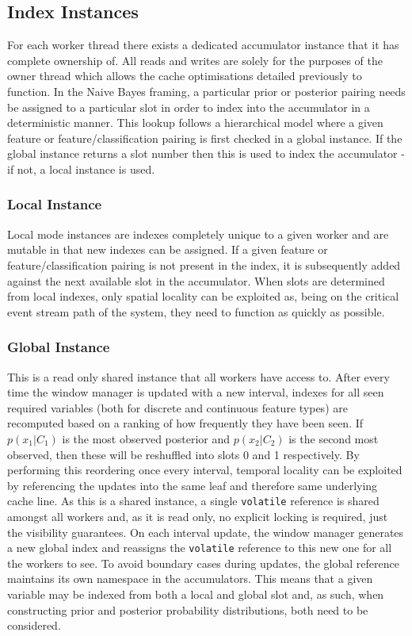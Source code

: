 \documentclass[a4paper,11pt]{scrreprt}
\begin{document}
\subsection{Index Instances}
For each worker thread there exists a dedicated accumulator instance that it has complete ownership of. All reads and writes are solely for the purposes of the owner thread which allows the cache optimisations detailed previously to function. In the Naive Bayes framing, a particular prior or posterior pairing needs be assigned to a particular slot in order to index into the accumulator in a deterministic manner. This lookup follows a hierarchical model where a given feature or feature/classification pairing is first checked in a global instance. If the global instance returns a slot number then this is used to index the accumulator - if not, a local instance is used.
\subsubsection{Local Instance}
Local mode instances are indexes completely unique to a given worker and are mutable in that new indexes can be assigned. If a given feature or feature/classification pairing is not present in the index, it is subsequently added against the next available slot in the accumulator. When slots are determined from local indexes, only spatial locality can be exploited as, being on the critical event stream path of the system, they need to function as quickly as possible.
\subsubsection{Global Instance}
This is a read only shared instance that all workers have access to. After every time the window manager is updated with a new interval, indexes for all seen required variables (both for discrete and continuous feature types) are recomputed based on a ranking of how frequently they have been seen. If \(p(x_1 | C_1)\) is the most observed posterior and \(p(x_2 | C_2)\) is the second most observed, then these will be reshuffled into slots 0 and 1 respectively. By performing this reordering once every interval, temporal locality can be exploited by referencing the updates into the same leaf and therefore same underlying cache line. As this is a shared instance, a single \texttt{volatile} reference is shared amongst all workers and, as it is read only, no explicit locking is required, just the visibility guarantees. On each interval update, the window manager generates a new global index and reassigns the \texttt{volatile} reference to this new one for all the workers to see. To avoid boundary cases during updates, the global reference maintains its own namespace in the accumulators. This means that a given variable may be indexed from both a local and global slot and, as such, when constructing prior and posterior probability distributions, both need to be considered.
\end{document}
